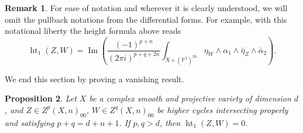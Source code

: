 \documentclass[11pt,a4paper]{amsart}
\renewcommand{\P}{\mathds{P}}
\DeclareMathOperator{\im}{Im}
\DeclareMathOperator{\Ht}{ht}
\numberwithin{equation}{section}
\theoremstyle{plain}
\newtheorem{prop}{Proposition}[section]
\theoremstyle{definition}
\newtheorem{rmk}[prop]{Remark}
\begin{document}
\begin{rmk}\label{rmk:5-12}
For ease of notation and wherever it is clearly understood, we will omit the pullback notations from the differential forms. For example, with this notational liberty the height formula above reads
\begin{displaymath}
      \Ht_{1}(Z,W)=\im  \left( \frac{(-1)^{p+n}}{(2\pi i)^{p+q+2n}}\int_{X\times
          (\P^{1})^{2n}}\eta_{W}\wedge \alpha _{1}\wedge
        \bar \eta_{Z} \wedge \bar \alpha _{2}\right).
    \end{displaymath}
\end{rmk}

We end this section by proving a vanishing result.
\begin{prop}\label{prop:5-14}
Let $X$ be a complex smooth and projective variety of dimension $d$, and $Z\in Z^{p}(X,n)_{00}$, $W\in Z^{q}(X,n)_{00}$ be higher cycles intersecting properly and satisfying $p+q=d+n+1$. If $p,q>d$, then $\Ht_{1}(Z,W)=0$.
\end{prop}
\end{document}
